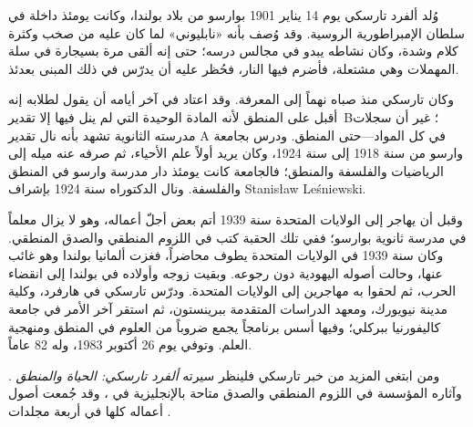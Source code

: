 \documentclass[../../../include/open-logic-section]{subfiles}
\begin{document}



وُلد ألفرد تارسكي يوم 14 يناير 1901 بوارسو من بلاد بولندا، وكانت يومئذ
داخلة في سلطان الإمبراطورية الروسية. وقد وُصف بأنه «نابليوني» لما كان
عليه من صخب وكثرة كلام وشدة، وكان نشاطه يبدو في مجالس درسه؛ حتى إنه ألقى
مرة بسيجارة في سلة المهملات وهي مشتعلة، فأضرم فيها النار، فحُظر عليه أن
يدرّس في ذلك المبنى بعدئذ.

وكان تارسكي منذ صباه نهماً إلى المعرفة. وقد اعتاد في آخر أيامه أن يقول
لطلابه إنه أقبل على المنطق لأنه المادة الوحيدة التي لم ينل فيها إلا
تقدير~B؛ غير أن سجلات مدرسته الثانوية تشهد بأنه نال تقدير A في كل
المواد---حتى المنطق. ودرس بجامعة وارسو من سنة 1918 إلى سنة 1924، وكان
يريد أولاً علم الأحياء، ثم صرفه عنه ميله إلى الرياضيات والفلسفة والمنطق؛
فالجامعة كانت يومئذ دار مدرسة وارسو في المنطق والفلسفة. ونال الدكتوراه سنة
1924 بإشراف Stanis\l{}aw Le\'{s}niewski.

وقبل أن يهاجر إلى الولايات المتحدة سنة 1939 أتم بعض أجلّ أعماله، وهو لا
يزال معلماً في مدرسة ثانوية بوارسو؛ ففي تلك الحقبة كتب في اللزوم المنطقي
والصدق المنطقي. وكان سنة 1939 في الولايات المتحدة يطوف محاضراً، فغزت
ألمانيا بولندا وهو غائب عنها، وحالت أصوله اليهودية دون رجوعه. وبقيت زوجه
وأولاده في بولندا إلى انقضاء الحرب، ثم لحقوا به مهاجرين إلى الولايات
المتحدة. ودرّس تارسكي في هارفرد، وكلية مدينة نيويورك، ومعهد الدراسات
المتقدمة ببرينستون، ثم استقر آخر الأمر في جامعة كاليفورنيا ببركلي؛ وفيها
أسس برنامجاً يجمع ضروباً من العلوم في المنطق ومنهجية العلم. وتوفي يوم 26
أكتوبر 1983، وله 82 عاماً.

\begin{reading}
ومن ابتغى المزيد من خبر تارسكي فلينظر سيرته \emph{ألفرد تارسكي: الحياة
والمنطق} \citep{Feferman2004}. وآثاره المؤسسة في اللزوم المنطقي والصدق
متاحة بالإنجليزية في \citep{Tarski1983}، وقد جُمعت أصول أعماله كلها في
أربعة مجلدات \citep{Tarski1981}.
\end{reading}
\end{document}
